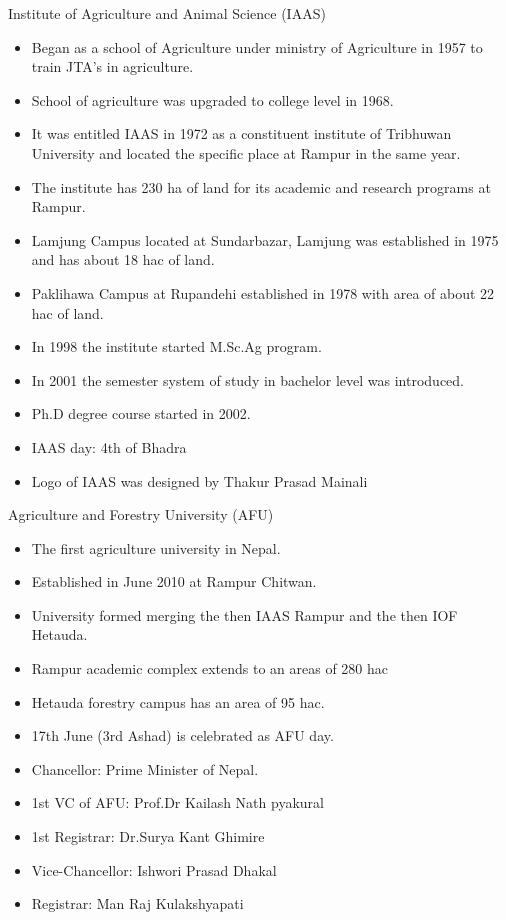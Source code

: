 \documentclass[
  openany]{book}
\providecommand{\tightlist}{%
  \setlength{\itemsep}{0pt}\setlength{\parskip}{0pt}}
\begin{document}
Institute of Agriculture and Animal Science (IAAS)

\begin{itemize}
\tightlist
\item
  Began as a school of Agriculture under ministry of Agriculture in 1957 to train JTA's in agriculture.
\item
  School of agriculture was upgraded to college level in 1968.
\item
  It was entitled IAAS in 1972 as a constituent institute of Tribhuwan University and located the specific place at Rampur in the same year.
\item
  The institute has 230 ha of land for its academic and research programs at Rampur.
\item
  Lamjung Campus located at Sundarbazar, Lamjung was established in 1975 and has about 18 hac of land.
\item
  Paklihawa Campus at Rupandehi established in 1978 with area of about 22 hac of land.
\item
  In 1998 the institute started M.Sc.Ag program.
\item
  In 2001 the semester system of study in bachelor level was introduced.
\item
  Ph.D degree course started in 2002.
\item
  IAAS day: 4th of Bhadra
\item
  Logo of IAAS was designed by Thakur Prasad Mainali
\end{itemize}

Agriculture and Forestry University (AFU)

\begin{itemize}
\tightlist
\item
  The first agriculture university in Nepal.
\item
  Established in June 2010 at Rampur Chitwan.
\item
  University formed merging the then IAAS Rampur and the then IOF Hetauda.
\item
  Rampur academic complex extends to an areas of 280 hac
\item
  Hetauda forestry campus has an area of 95 hac.
\item
  17th June (3rd Ashad) is celebrated as AFU day.
\item
  Chancellor: Prime Minister of Nepal.
\item
  1st VC of AFU: Prof.Dr Kailash Nath pyakural
\item
  1st Registrar: Dr.Surya Kant Ghimire
\item
  Vice-Chancellor: Ishwori Prasad Dhakal
\item
  Registrar: Man Raj Kulakshyapati
\end{itemize}
\end{document}
